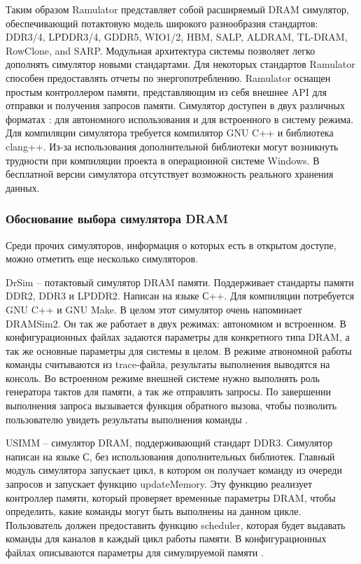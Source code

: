 Таким образом Ramulator представляет собой расширяемый DRAM симулятор, обеспечивающий потактовую модель широкого разнообразия стандартов: DDR3/4, LPDDR3/4, GDDR5, WIO1/2, HBM, SALP, ALDRAM, TL-DRAM, RowClone, and SARP. Модульная архитектура системы позволяет легко дополнять симулятор новыми стандартами. Для некоторых стандартов Ramulator способен предоставлять отчеты по энергопотреблению. Ramulator оснащен простым контроллером памяти, представляющим из себя внешнее API для отправки и получения запросов памяти. Симулятор доступен в двух различных форматах : для автономного использования и для встроенного в систему режима. Для компиляции симулятора требуется компилятор GNU C++ и библиотека clang++. Из-за использования дополнительной библиотеки могут возникнуть трудности при компиляции проекта в операционной системе Windows. В бесплатной версии симулятора отсутствует возможность реального хранения данных.

\subsubsection{Обоснование выбора симулятора DRAM}
\label{sub:domain:simulators:simulator_choice}
Среди прочих симуляторов, информация о которых есть в открытом доступе, можно отметить еще несколько симуляторов. 

DrSim – потактовый симулятор DRAM памяти. Поддерживает стандарты памяти DDR2, DDR3 и LPDDR2. Написан на языке С++. Для компиляции потребуется GNU C++ и GNU Make. В целом этот симулятор очень напоминает DRAMSim2. Он так же работает в двух режимах: автономном и встроенном. В конфигурационных файлах задаются параметры для конкретного типа DRAM, а так же основные параметры для системы в целом. В режиме атвономной работы команды считываются из trace-файла, результаты выполнения выводятся на консоль. Во встроенном режиме внешней системе нужно выполнять роль генератора тактов для памяти, а так же отправлять запросы. По завершении выполнения запроса вызывается функция обратного вызова, чтобы позволить пользователю увидеть результаты выполнения команды \cite{drsim_manual}.

USIMM – симулятор DRAM, поддерживающий стандарт DDR3. Симулятор написан на языке С, без использования дополнительных библиотек. Главный модуль симулятора запускает цикл, в котором он получает команду из очереди запросов и запускает функцию updateMemory. Эту функцию реализует контроллер памяти, который проверяет временные параметры DRAM, чтобы определить, какие команды могут быть выполнены на данном цикле. Пользователь должен предоставить функцию scheduler, которая будет выдавать команды для каналов в каждый цикл работы памяти. В конфигурационных файлах описываются параметры для симулируемой памяти \cite{usimm_manual}. 

